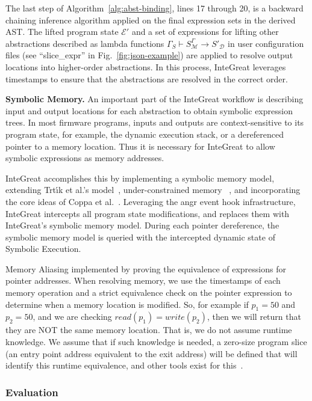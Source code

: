 The last step of Algorithm~\ref{alg:abst-binding}, lines 17 through 20, is a backward chaining inference algorithm applied on the final expression sets in the derived AST.
The lifted program state $\mathcal{E}'$ and a set of expressions for lifting other abstractions described as lambda functions $\Gamma_{S} \vdash S^{\Gamma}_{\mathcal{M}} \rightarrow S'_{\mathcal{D}}$ in user configuration files (see ``slice\_expr'' in Fig.~\ref{fig:json-example}) are applied to resolve output locations into higher-order abstractions.
In this process, InteGreat leverages timestamps to ensure that the abstractions are resolved in the correct order.

\label{sec:symb-mem-expl}
\textbf{Symbolic Memory.}
An important part of the InteGreat workflow is describing input and output locations for each abstraction to obtain symbolic expression trees.
 In most firmware programs, inputs and outputs are context-sensitive to its program state, for example, the dynamic execution stack, or a dereferenced pointer to a memory location.
 Thus it is necessary for InteGreat to allow symbolic expressions as memory addresses.

InteGreat accomplishes this by implementing a symbolic memory model, extending Trt{\'\i}k et al.'s model~\cite{symbolic-memory}, under-constrained memory ~\cite{Under-Constrained}, and incorporating the core ideas of Coppa et al.~\cite{coppa2017rethinking}.
Leveraging the angr event hook infrastructure, InteGreat intercepts all program state modifications, and replaces them with InteGreat's symbolic memory model. 
During each pointer dereference, the symbolic memory model is queried with the intercepted dynamic state of Symbolic Execution.

Memory Aliasing implemented by proving the equivalence of expressions for pointer addresses.
When resolving memory, we use the timestamps of each memory operation and a strict equivalence check on the pointer expression to determine when a memory location is modified.
So, for example if $p_{1} = 50$ and $p_{2} = 50$, and we are checking $read(p_{1}) = write(p_{2})$, then we will return that they are NOT the same memory location. 
That is, we do not assume runtime knowledge. 
We assume that if such knowledge is needed, a zero-size program slice (an entry point address equivalent to the exit address) will be defined that will identify this runtime equivalence, and other tools exist for this~\cite{hind2001pointer}.

\subsubsection{Evaluation}

